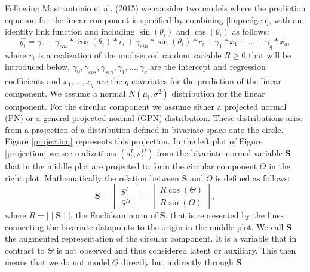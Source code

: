 \documentclass[man,mask]{apa6}
\begin{document}
Following Mastrantonio et al. (2015) we consider two models where the prediction
equation for the linear component is specified by combining \eqref{linpredgen},
with an identity link function and including \(\sin(\theta_i)\) and
\(\cos(\theta_i)\) as follows:
\begin{equation}\label{linpredCLPNCLGPN}
\hat{y_i} = \gamma_0 + \gamma_{cos}*\cos(\theta_i)*r_i + \gamma_{sin}*\sin(\theta_i)*r_i + \gamma_1*x_1 + \dots + \gamma_q*x_q,
\end{equation}
\noindent where \(r_i\) is a realization of the unobserved random variable
\(R\geq0\) that will be introduced below, \(\gamma_0, \gamma_{cos}, \gamma_{sin}, \gamma_1, \dots, \gamma_q\) are the intercept and regression
coefficients and \(x_1, \dots, x_q\) are the \(q\) covariates for the prediction
of the linear component. We assume a normal \(N(\mu_l, \sigma^2)\) distribution
for the linear component.\newline
\indent For the circular component we assume either a projected normal (PN) or a
general projected normal (GPN) distribution. These distributions arise from a
projection of a distribution defined in bivariate space onto the circle. Figure
\ref{projection} represents this projection. In the left plot of Figure
\ref{projection} we see realizations \((s_i^{I}, s_i^{II})\) from the bivariate
normal variable \(\boldsymbol{S}\) that in the middle plot are projected to form
the circular component \(\Theta\) in the right plot. Mathematically the relation
between \(\boldsymbol{S}\) and \(\Theta\) is defined as follows:
\begin{equation}\label{projection_eq}
\boldsymbol{S} = \begin{bmatrix} S^{I} \\ S^{II} \end{bmatrix} = \begin{bmatrix} R \cos (\Theta) \\  R\sin (\Theta) \end{bmatrix},
\end{equation}
\noindent where \(R = \mid\mid \boldsymbol{S} \mid\mid\), the Euclidean norm of
\(\boldsymbol{S}\), that is represented by the lines connecting the bivariate
datapoints to the origin in the middle plot. We call \(\boldsymbol{S}\) the
augmented representation of the circular component. It is a variable that in
contrast to \(\Theta\) is not observed and thus considered latent or auxiliary.
This then means that we do not model \(\Theta\) directly but indirectly through
\(\boldsymbol{S}\).
\end{document}
